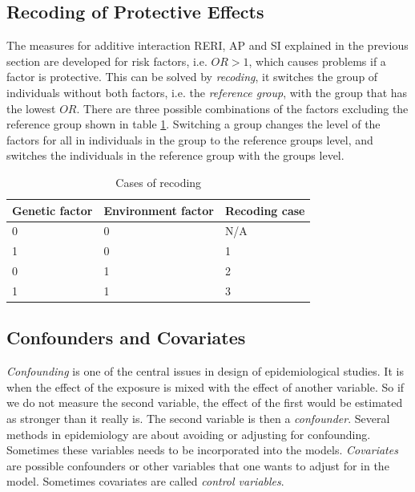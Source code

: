 \documentclass[10pt,a4paper]{report}
\begin{document}
\subsection{Recoding of Protective Effects}
\label{recode}
The measures for additive interaction RERI, AP and SI explained in the previous section are developed for risk factors, i.e. $OR>1$, which causes problems if a factor is protective\cite{recoding_2011}. This can be solved by \emph{recoding}, it switches the group of individuals without both factors, i.e. the \emph{reference group}, with the group that has the lowest  $OR$\cite{recoding_2011}. There are three possible combinations of the factors excluding the reference group shown in table \ref{table:recoding_cases}. Switching a group changes the level of the factors for all in individuals in the group to the reference groups level, and switches the individuals in the reference group with the groups level.

\begin{table}[h]
\begin{tabular}{| l l l |}
  \hline
  Genetic factor & Environment factor & Recoding case\\
  \hline
  0 & 0 & N/A \\
  1 & 0 & 1 \\
  0 & 1 & 2 \\
  1 & 1 & 3 \\
  \hline
\end{tabular}
\caption{Cases of recoding}
\label{table:recoding_cases}
\end{table}

\subsection{Confounders and Covariates}
\emph{Confounding} is one of the central issues in design of epidemiological studies. It is when the effect of the exposure is mixed with the effect of another variable. So if we do not measure the second variable, the effect of the first would be estimated as stronger than it really is. The second variable is then a \emph{confounder}. Several methods in epidemiology are about avoiding or adjusting for confounding. Sometimes these variables needs to be incorporated into the models. \emph{Covariates} are possible confounders or other variables that one wants to adjust for in the model. Sometimes covariates are called \emph{control variables}.\cite{rothman2002intro_epidemiology,rothman2008modern}
\end{document}
